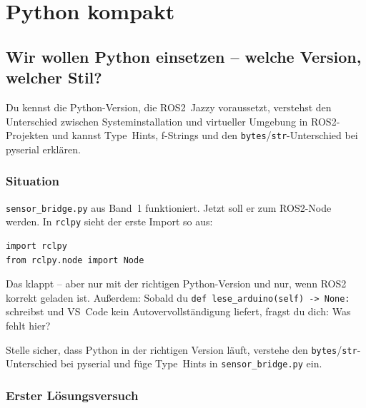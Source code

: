 
\part{Python kompakt}

\chapter{Wir wollen Python einsetzen – welche Version, welcher Stil?}

\begin{lernziele}
Du kennst die Python-Version, die ROS2~Jazzy voraussetzt,
verstehst den Unterschied zwischen Systeminstallation und
virtueller Umgebung in ROS2-Projekten und kannst
Type~Hints, f-Strings und den \texttt{bytes}/\texttt{str}-Unterschied
bei pyserial erklären.
\end{lernziele}

\section{Situation}

\texttt{sensor\_bridge.py} aus Band~1 funktioniert.
Jetzt soll er zum ROS2-Node werden.
In \texttt{rclpy} sieht der erste Import so aus:

\begin{lstlisting}
import rclpy
from rclpy.node import Node
\end{lstlisting}

Das klappt -- aber nur mit der richtigen Python-Version
und nur, wenn ROS2 korrekt geladen ist.
Außerdem: Sobald du \texttt{def lese\_arduino(self) -> None:} schreibst
und VS~Code kein Autovervollständigung liefert, fragst du dich:
Was fehlt hier?

\begin{aufgabeBox}
Stelle sicher, dass Python in der richtigen Version läuft,
verstehe den \texttt{bytes}/\texttt{str}-Unterschied bei pyserial
und füge Type~Hints in \texttt{sensor\_bridge.py} ein.
\end{aufgabeBox}

\section{Erster Lösungsversuch}

